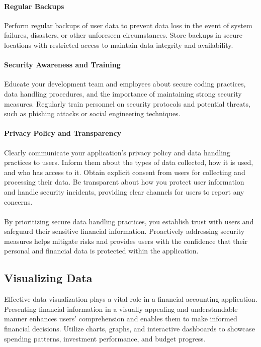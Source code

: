 \paragraph{Regular Backups}
Perform regular backups of user data to prevent data loss in the event of system failures, 
disasters, or other unforeseen circumstances. Store backups in secure locations with restricted access to 
maintain data integrity and availability.

\paragraph{Security Awareness and Training}
Educate your development team and employees about secure coding practices, data 
handling procedures, and the importance of maintaining strong security measures. Regularly train personnel on 
security protocols and potential threats, such as phishing attacks or social engineering techniques.

\paragraph{Privacy Policy and Transparency}
Clearly communicate your application's privacy policy and data handling practices to 
users. Inform them about the types of data collected, how it is used, and who has access to it. Obtain explicit 
consent from users for collecting and processing their data. Be transparent about how you protect user information 
and handle security incidents, providing clear channels for users to report any concerns.\\
\\

By prioritizing secure data handling practices, you establish trust with users and safeguard their sensitive 
financial information. Proactively addressing security measures helps mitigate risks and provides users with 
the confidence that their personal and financial data is protected within the application.


\subsection{Visualizing Data}

Effective data visualization plays a vital role in a financial accounting application. Presenting financial 
information in a visually appealing and understandable manner enhances users' comprehension and enables them 
to make informed financial decisions. Utilize charts, graphs, and interactive dashboards to showcase spending 
patterns, investment performance, and budget progress.

